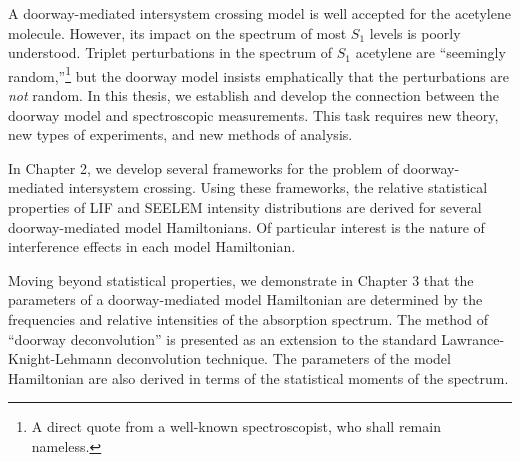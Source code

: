 
A doorway-mediated intersystem crossing model is well accepted for the
acetylene molecule.  However, its impact on the spectrum of most $S_1$
levels is poorly understood.  Triplet perturbations in the spectrum of
$S_1$ acetylene are ``seemingly random,''\footnote{A direct quote from
  a well-known spectroscopist, who shall remain nameless.} but the
doorway model insists emphatically that the perturbations are
\emph{not} random.  In this thesis, we establish and develop the
connection between the doorway model and spectroscopic measurements.
This task requires new theory, new types of experiments, and new
methods of analysis.


In Chapter 2, we develop several frameworks for the problem of
doorway-mediated intersystem crossing.  Using these frameworks, the
relative statistical properties of LIF and SEELEM intensity
distributions are derived for several doorway-mediated model
Hamiltonians.  Of particular interest is the nature of interference
effects in each model Hamiltonian.

Moving beyond statistical properties, we demonstrate in Chapter 3 that
the parameters of a doorway-mediated model Hamiltonian are determined
by the frequencies and relative intensities of the absorption
spectrum.  The method of ``doorway deconvolution'' is presented as an
extension to the standard Lawrance-Knight-Lehmann deconvolution
technique.  The parameters of the model Hamiltonian are also derived
in terms of the statistical moments of the spectrum.


